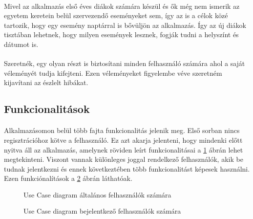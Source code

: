 \documentclass{article}
\begin{document}
	\paragraph{}
	Mivel az alkalmazás első éves diákok számára készül és ők még nem ismerik az egyetem keretein belül szervezendő eseményeket sem, így az is a célok közé tartozik, hogy egy esemény naptárral is bővüljön az alkalmazás. Így az új diákok tisztában lehetnek, hogy milyen események lesznek, fogják tudni a helyszínt és dátumot is.
	\paragraph{}
	Szeretnék, egy olyan részt is biztosítani minden felhasználó számára ahol a saját véleményét tudja kifejteni. Ezen véleményeket figyelembe véve szeretném kijavítani az észlelt hibákat.
	
	\subsection{Funkcionalitások}
	\paragraph{}
	Alkalmazásomon belül több fajta funkcionalitás jelenik meg. Első sorban nincs regisztrációhoz kötve a felhasználó. Ez azt akarja jelenteni, hogy mindenki előtt nyitva áll az alkalmazás, amelynek röviden leírt funkcionalitásai a \ref{fig:UseCaseEvery} ábrán lehet megtekinteni. Viszont vannak különleges joggal rendelkező felhasználók, akik be tudnak jelentkezni és ennek következtében több funkcionalitást képesek használni. Ezen funkciónalítások a \ref{fig:UseCaseAdmin} ábrán láthatóak.
	
	\begin{figure}
		\centering
		\caption{Use Case diagram általános felhasználók számára}
		\label{fig:UseCaseEvery}
	\end{figure}

	\begin{figure}
		\centering
		\caption{Use Case diagram bejelentkező felhasználók számára}
		\label{fig:UseCaseAdmin}
	\end{figure}
\end{document}
